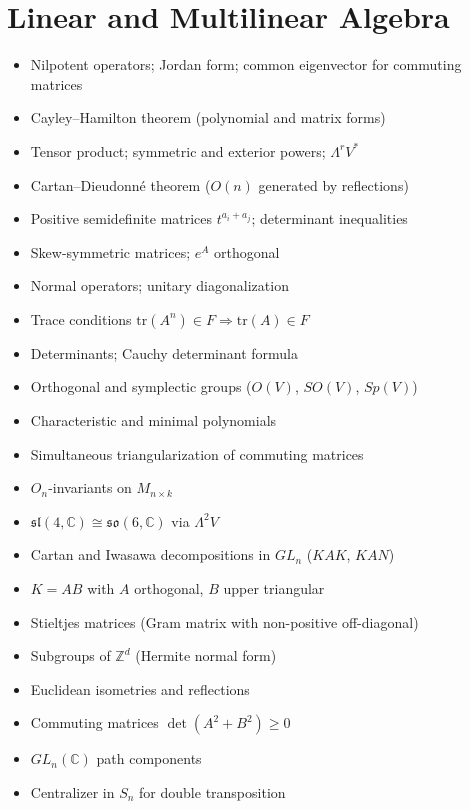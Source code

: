 \documentclass{amsart}
\begin{document}
\section{Linear and Multilinear Algebra}

\begin{itemize}
  \item Nilpotent operators; Jordan form; common eigenvector for commuting matrices
  \item Cayley--Hamilton theorem (polynomial and matrix forms)
  \item Tensor product; symmetric and exterior powers; $\Lambda^r V^*$
  \item Cartan--Dieudonn\'e theorem ($O(n)$ generated by reflections)
  \item Positive semidefinite matrices $t^{a_i+a_j}$; determinant inequalities
  \item Skew-symmetric matrices; $e^A$ orthogonal
  \item Normal operators; unitary diagonalization
  \item Trace conditions $\mathrm{tr}(A^n)\in F\Rightarrow\mathrm{tr}(A)\in F$
  \item Determinants; Cauchy determinant formula
  \item Orthogonal and symplectic groups ($O(V)$, $SO(V)$, $Sp(V)$)
  \item Characteristic and minimal polynomials
  \item Simultaneous triangularization of commuting matrices
  \item $O_n$-invariants on $M_{n \times k}$
  \item $\mathfrak{sl}(4,\mathbb{C}) \cong \mathfrak{so}(6,\mathbb{C})$ via $\Lambda^2 V$
  \item Cartan and Iwasawa decompositions in $GL_n$ ($KAK$, $KAN$)
  \item $K=AB$ with $A$ orthogonal, $B$ upper triangular
  \item Stieltjes matrices (Gram matrix with non-positive off-diagonal)
  \item Subgroups of $\mathbb{Z}^d$ (Hermite normal form)
  \item Euclidean isometries and reflections
  \item Commuting matrices $\det(A^2+B^2) \geq 0$
  \item $GL_n(\mathbb{C})$ path components
  \item Centralizer in $S_n$ for double transposition
\end{itemize}
\end{document}
